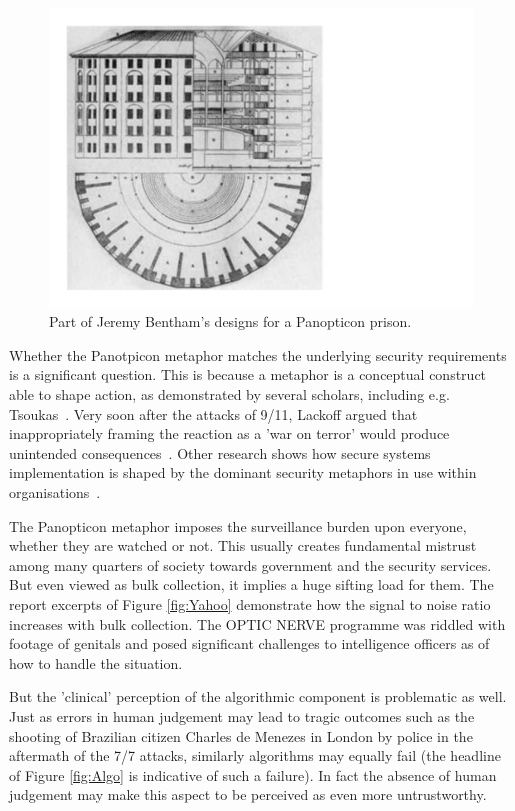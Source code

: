 \documentclass{llncs}
\begin{document}
\begin{figure}
\begin{center}
\includegraphics[scale=0.3]{fig2}
\caption{Part of Jeremy Bentham's designs for a Panopticon prison.}
\label{fig:Panopticon}
\end{center}
\end{figure}

Whether the Panotpicon metaphor matches the underlying security requirements is a significant question. This is because a metaphor is a conceptual construct able to shape action, as demonstrated by several scholars, including e.g. Tsoukas~\cite{Tsoukas}. Very soon after the attacks of 9/11, Lackoff argued that inappropriately framing the reaction as a 'war on terror' would produce unintended consequences~\cite{Lackoff}. Other research shows how secure systems implementation is shaped by the dominant security metaphors in use within organisations~\cite{Tryfonas}.

The Panopticon metaphor imposes the surveillance burden upon everyone, whether they are watched or not. This usually creates fundamental mistrust among many quarters of society towards government and the security services. But even viewed as bulk collection, it implies a huge sifting load for them. The report excerpts of Figure \ref{fig:Yahoo} demonstrate how the signal to noise ratio increases with bulk collection. The OPTIC NERVE programme was riddled with footage of genitals and posed significant challenges to intelligence officers as of how to handle the situation.

But the 'clinical' perception of the algorithmic component is problematic as well. Just as errors in human judgement may lead to tragic outcomes such as the shooting of Brazilian citizen Charles de Menezes in London by police in the aftermath of the 7/7 attacks, similarly algorithms may equally fail (the headline of Figure \ref{fig:Algo} is indicative of such a failure). In fact the absence of human judgement may make this aspect to be perceived as even more untrustworthy. 
\end{document}

